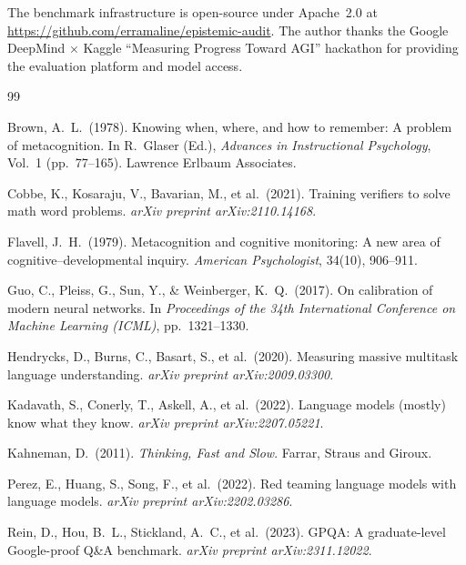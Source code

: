\documentclass[12pt,a4paper]{article}
\begin{document}
The benchmark infrastructure is open-source under Apache~2.0 at
\url{https://github.com/erramaline/epistemic-audit}. The author thanks the
Google DeepMind $\times$ Kaggle ``Measuring Progress Toward AGI'' hackathon for
providing the evaluation platform and model access.


\begin{thebibliography}{99}

Brown, A.~L.\ (1978).
\newblock Knowing when, where, and how to remember: A problem of metacognition.
\newblock In R.~Glaser (Ed.), \textit{Advances in Instructional Psychology},
  Vol.~1 (pp.~77--165). Lawrence Erlbaum Associates.

Cobbe, K., Kosaraju, V., Bavarian, M., et al.\ (2021).
\newblock Training verifiers to solve math word problems.
\newblock \textit{arXiv preprint arXiv:2110.14168}.

Flavell, J.~H.\ (1979).
\newblock Metacognition and cognitive monitoring: A new area of
  cognitive--developmental inquiry.
\newblock \textit{American Psychologist}, 34(10), 906--911.

Guo, C., Pleiss, G., Sun, Y., \& Weinberger, K.~Q.\ (2017).
\newblock On calibration of modern neural networks.
\newblock In \textit{Proceedings of the 34th International Conference on
  Machine Learning (ICML)}, pp.\ 1321--1330.

Hendrycks, D., Burns, C., Basart, S., et al.\ (2020).
\newblock Measuring massive multitask language understanding.
\newblock \textit{arXiv preprint arXiv:2009.03300}.

Kadavath, S., Conerly, T., Askell, A., et al.\ (2022).
\newblock Language models (mostly) know what they know.
\newblock \textit{arXiv preprint arXiv:2207.05221}.

Kahneman, D.\ (2011).
\newblock \textit{Thinking, Fast and Slow}.
\newblock Farrar, Straus and Giroux.

Perez, E., Huang, S., Song, F., et al.\ (2022).
\newblock Red teaming language models with language models.
\newblock \textit{arXiv preprint arXiv:2202.03286}.

Rein, D., Hou, B.~L., Stickland, A.~C., et al.\ (2023).
\newblock GPQA: A graduate-level Google-proof Q\&A benchmark.
\newblock \textit{arXiv preprint arXiv:2311.12022}.

\end{thebibliography}
\end{document}
